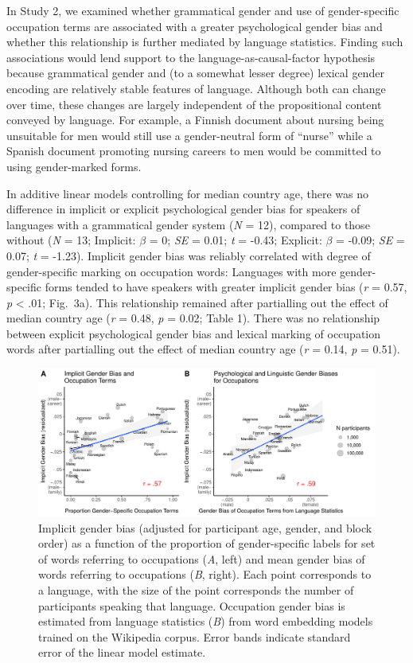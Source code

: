 \documentclass[9pt,twocolumn,twoside,lineno]{pnas-new}
\begin{document}
In Study 2, we examined whether grammatical gender and use of
gender-specific occupation terms are associated with a greater
psychological gender bias and whether this relationship is further
mediated by language statistics. Finding such associations would lend support to the language-as-causal-factor hypothesis because grammatical gender and (to a somewhat lesser degree) lexical gender encoding are relatively stable features of language. Although both can change over time, these changes are largely independent of the propositional content conveyed by language. For example, a Finnish document about nursing being unsuitable for men would still use a gender-neutral form of
\enquote{nurse} while a Spanish document promoting nursing careers to
men would be committed to using gender-marked forms.


In additive linear models controlling for median country age, there was
no difference in implicit or explicit psychological gender bias for
speakers of languages with a grammatical gender system (\emph{N} = 12),
compared to those without (\emph{N} = 13; Implicit: \(\beta\) = 0;
\emph{SE} = 0.01; \emph{t} = -0.43; Explicit: \(\beta\) = -0.09;
\emph{SE} = 0.07; \emph{t} = -1.23).  Implicit gender
bias was reliably correlated with degree of gender-specific marking on
occupation words: Languages with more gender-specific forms tended to
have speakers with greater implicit gender bias (\emph{r} = 0.57,
\emph{p} \textless{} .01; Fig.\ 3a). This relationship remained after partialling out the effect of
median country age (\emph{r} = 0.48, \emph{p} = 0.02; Table 1). There
was no relationship between explicit psychological gender bias and
lexical marking of occupation words after partialling out the effect of
median country age (\emph{r} = 0.14, \emph{p} = 0.51).

\begin{figure}[t!]
\centering
\includegraphics[width=17cm]{pnas_rmd/iat_lang_pnas_files/figure-latex/study2_fig.pdf}
\caption{\label{fig:unnamed-chunk-15}Implicit gender bias (adjusted for participant age,
gender, and block order) as a function of the proportion of gender-specific labels for set of words referring to occupations ({\it A}, left) and  mean gender bias of words
referring to occupations ({\it B}, right). Each point corresponds to a language, with the size of the point corresponds the number of participants
speaking that language. Occupation gender bias is estimated from language statistics ({\it B}) from word embedding models trained on the
Wikipedia  corpus. Error bands indicate standard error of the
linear model estimate.}
\end{figure}
\end{document}
